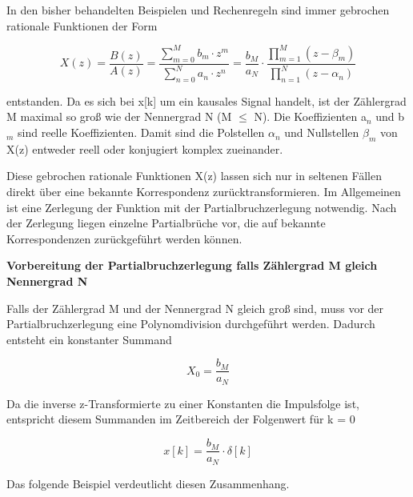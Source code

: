 \noindent In den bisher behandelten Beispielen und Rechenregeln sind immer gebrochen rationale Funktionen der Form 

\begin{equation}\label{eq:fiveeightysix}
X\left(z\right)=\frac{B\left(z\right)}{A\left(z\right)} =\frac{\sum _{m=0}^{M}b_{m} \cdot z^{m}  }{\sum _{n=0}^{N}a_{n} \cdot z^{n}  } =\frac{b_{M} }{a_{N} } \cdot \frac{\prod _{m=1}^{M}\left(z-\beta _{m} \right) }{\prod _{n=1}^{N}\left(z-\alpha _{n} \right) }
\end{equation}

\noindent entstanden. Da es sich bei x[k] um ein kausales Signal handelt, ist der Z\"{a}hlergrad M maximal so gro{\ss} wie der Nennergrad N (M $\mathrm{\le}$ N). Die Koeffizienten a${}_{n}$ und b${}_{m}$ sind reelle Koeffizienten. Damit sind die Polstellen $\alpha_{n}$ und Nullstellen $\beta_{m}$ von X(z) entweder reell oder konjugiert komplex zueinander.\bigskip

\noindent Diese gebrochen rationale Funktionen X(z) lassen sich nur in seltenen F\"{a}llen direkt \"{u}ber eine bekannte Korrespondenz zur\"{u}cktransformieren. Im Allgemeinen ist eine Zerlegung der Funktion mit der Partialbruchzerlegung notwendig. Nach der Zerlegung liegen einzelne Partialbr\"{u}che vor, die auf bekannte Korrespondenzen zur\"{u}ckgef\"{u}hrt werden k\"{o}nnen. \bigskip

{\selectfont
\noindent\textbf{Vorbereitung der Partialbruchzerlegung falls Zählergrad M gleich Nennergrad N}}\smallskip

\noindent Falls der Z\"{a}hlergrad M und der Nennergrad N gleich gro{\ss} sind, muss vor der Partialbruchzerlegung eine Polynomdivision durchgef\"{u}hrt werden. Dadurch entsteht ein konstanter Summand 

\begin{equation}\label{eq:fiveeightyseven}
X_{0} =\frac{b_{M} }{a_{N} }
\end{equation}

\noindent Da die inverse z-Transformierte zu einer Konstanten die Impulsfolge ist, entspricht diesem Summanden im Zeitbereich der Folgenwert f\"{u}r k = 0

\begin{equation}\label{eq:fiveeightyeight}
x\left[k\right]=\frac{b_{M} }{a_{N} } \cdot \delta \left[k\right]
\end{equation}

\noindent Das folgende Beispiel verdeutlicht diesen Zusammenhang.\bigskip

